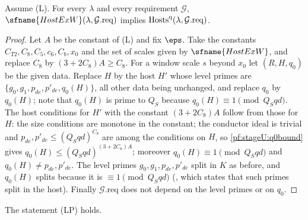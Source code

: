 \begin{lemma}\label{pf:stageU:hostq}
Assume \textup{(L)}. For every $\lambda$ and every requirement $\mathcal G$, $\sfname{HostExW}(\lambda,\mathcal G.\mathrm{req})$
implies $\mathrm{Hosts}^{\mathrm q}(\lambda,\mathcal G.\mathrm{req})$.
\end{lemma}

\begin{proof}
Let $A$ be the constant of (L) and fix $\eps$. Take the constants $C_{T2},C_8,C_5,c_6,C_b,x_0$ and the set of scales given by
$\sfname{HostExW}$, and replace $C_8$ by $(3+2C_8)A\ge C_8$. For a window scale $s$ beyond $x_0$ let $(R,H,q_0)$ be the given
data. Replace $H$ by the host $H'$ whose level primes are $\{g_0,g_1,p_{de},p'_{de},q_0(H)\}$, all other data being
unchanged, and replace $q_0$ by $q_0(H)$; note that $q_0(H)$ is prime to $Q_S$ because $q_0(H)\equiv1\pmod{Q_Sqd}$. The host
conditions for $H'$ with the constant $(3+2C_8)A$ follow from those for $H$: the size conditions are monotone in the
constant; the conductor ideal is trivial and $p_{de},p'_{de}\le(Q_Sqd)^{C_8}$ are among the conditions on $H$, so
\cref{pf:stageU:q0bound} gives $q_0(H)\le(Q_Sqd)^{(3+2C_8)A}$; moreover $q_0(H)\equiv1\pmod{Q_Sqd}$ and
$q_0(H)\ne p_{de},p'_{de}$. The level primes $g_0,g_1,p_{de},p'_{de}$ split in $K$ as before, and $q_0(H)$ splits because it
is $\equiv1\pmod{Q_Sqd}$ (, which states that such primes split in the
host). Finally $\mathcal G.\mathrm{req}$ does not depend on the level primes or on $q_0$.
\end{proof}

\begin{lemma}\label{pf:stageU:levelprime}
The statement \textup{(LP)} holds.
\end{lemma}

